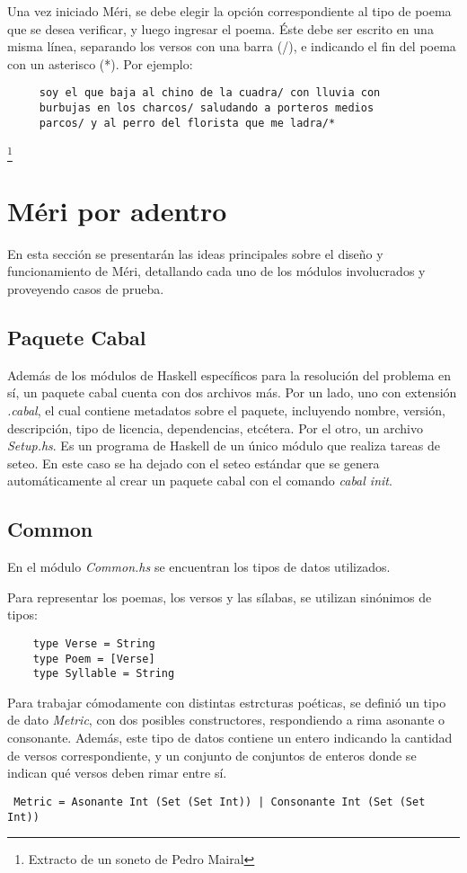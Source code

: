 \documentclass[12pt, a4paper]{article}
\begin{document}
Una vez iniciado Méri, se debe elegir la opción correspondiente al tipo de poema que se desea verificar, y luego ingresar el poema. Éste debe ser escrito en una misma línea, separando los versos con una barra (/), e indicando el fin del poema con un asterisco (*). Por ejemplo:
\begin{verbatim}
     soy el que baja al chino de la cuadra/ con lluvia con 
     burbujas en los charcos/ saludando a porteros medios 
     parcos/ y al perro del florista que me ladra/*
\end{verbatim}\footnote{Extracto de un soneto de Pedro Mairal}
\section*{Méri por adentro}
En esta sección se presentarán las ideas principales sobre el diseño y funcionamiento de Méri, detallando cada uno de los módulos involucrados y proveyendo casos de prueba.

\subsection*{Paquete Cabal}
Además de los módulos de Haskell específicos para la resolución del problema en sí, un paquete cabal cuenta con dos archivos más. Por un lado, uno con extensión \textit{.cabal}, el cual contiene metadatos sobre el paquete, incluyendo nombre, versión, descripción, tipo de licencia, dependencias, etcétera. Por el otro, un archivo \textit{Setup.hs}. Es un programa de Haskell de un único módulo que realiza tareas de seteo. En este caso se ha dejado con el seteo estándar que se genera automáticamente al crear un paquete cabal con el comando \textit{cabal init}.  

\subsection*{Common}
En el módulo \textit{Common.hs} se encuentran los tipos de datos utilizados.

\medskip
Para representar los poemas, los versos y las sílabas, se utilizan sinónimos de tipos:
\begin{verbatim}
    type Verse = String
    type Poem = [Verse]
    type Syllable = String
\end{verbatim}

Para trabajar cómodamente con distintas estrcturas poéticas, se definió un tipo de dato \textit{Metric}, con dos posibles constructores, respondiendo a rima asonante o consonante. Además, este tipo de datos contiene un entero indicando la cantidad de versos correspondiente, y un conjunto de conjuntos de enteros donde se indican qué versos deben rimar entre sí.
\begin{verbatim}
 Metric = Asonante Int (Set (Set Int)) | Consonante Int (Set (Set Int))
\end{verbatim}
\end{document}
